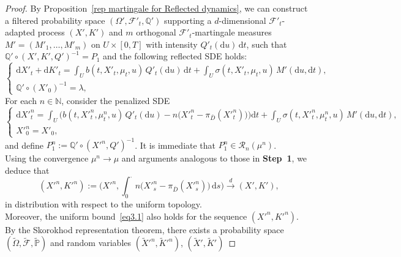 \documentclass[11pt,amsfonts]{article}
\theoremstyle{plain}
\theoremstyle{assumpstyle}
\numberwithin{equation}{section}
\numberwithin{theorem}{section}
\numberwithin{proposition}{section}
\numberwithin{definition}{section}
\numberwithin{remark}{section}
\numberwithin{corollary}{section}
\numberwithin{lemma}{section}
\begin{document}
\begin{proof}
By Proposition~\ref{rep martingale for Reflected dynamics}, 
we can construct a filtered probability space 
$(\Omega', \mathcal{F}'_t, \mathbb{Q}')$
supporting a $d$-dimensional 
$\mathcal{F}'_t$-adapted process 
$(X', K')$ and 
$m$ orthogonal $\mathcal{F}'_t$-martingale measures 
$ M' = (M'_1, \ldots, M'_m) $
on $ U \times [0,T]$ with intensity 
$ Q'_t(\mathrm{d}u)\,\mathrm{d}t$,
such that 
$ \mathbb{Q}' \circ (X', K', Q')^{-1} = P_1 $
and the following reflected SDE holds:
\begin{equation}\label{eq:refSDEX'}
\begin{cases}
\mathrm{d}X'_t+
\mathrm{d}K'_t
= 
\displaystyle\int_U b(t, X'_t, \mu_t, u)\,
Q'_t(\mathrm{d}u)\,\mathrm{d}t
+
\displaystyle\int_U \sigma(t, X'_t, \mu_t, u)\,
M'(\mathrm{d}u, \mathrm{d}t)
, \\[6pt]
\mathbb{Q}'\circ(X'_0)^{-1} = \lambda,
\end{cases}
\end{equation}
For each $ n \in \mathbb{N} $, consider the penalized SDE
\begin{equation}\label{eq:penalXn}
\begin{cases}
\mathrm{d}X'^n_t
=
\displaystyle\int_U 
\Big(b(t, X'^n_t, \mu^n_t, u)\,Q'_t(\mathrm{d}u)
- n\big(X'^n_t - \pi_{\bar{D}}(X'^n_t)\big)\Big)
\mathrm{d}t
+
\displaystyle\int_U 
\sigma(t, X'^n_t, \mu^n_t, u)\,
M'(\mathrm{d}u, \mathrm{d}t),\\
X'^n_0 = X'_{0},
\end{cases}
\end{equation}
and define 
$ P^n_1 := \mathbb{Q}' \circ (X'^n, Q')^{-1} $.
It is immediate that 
$P^n_1 \in \mathcal{R}_n(\mu^n) $.\\
Using the convergence $ \mu^n \to \mu $ and arguments analogous to those in \textbf{Step~1}, 
we deduce that
\begin{equation}\label{eq:convXnKn}
(X'^n, K'^n)
:=
\Biggl(X'^n, 
\int_0^{\cdot} n \bigl(X'^n_s - \pi_{\bar{D}}(X'^n_s)\bigr)\, \mathrm{d}s \Biggr)
\xrightarrow{d} 
(X', K'),
\end{equation}
in distribution with respect to the uniform topology.\\
Moreover, the uniform bound~\eqref{eq3.1} also holds for the sequence $(X'^n, K'^n)$.\\
By the Skorokhod representation theorem, 
there exists a probability space 
$(\tilde{\Omega}, \tilde{\mathcal{F}}, \tilde{\mathbb{P}})$ 
and random variables 
$(\tilde{X}'^n, \tilde{K}'^n)$, 
$(\tilde{X}', \tilde{K}')$

\end{proof}
\end{document}
